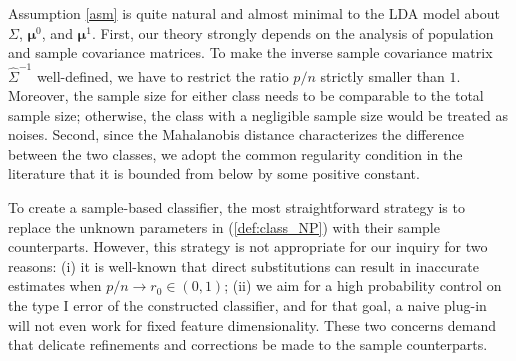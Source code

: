 \documentclass[12pt]{article}
\numberwithin{equation}{section}
\theoremstyle{remark}
\newcommand{\1}{{\rm 1}\kern-0.24em{\rm I}}
\begin{document}
 Assumption \ref{asm} is quite natural and almost minimal to the LDA model about $\Sigma$, ${\bm \mu}^0$, and ${\bm \mu}^1$.  First, our theory strongly depends on the analysis of population and  sample covariance matrices. To make the inverse  sample covariance matrix $\widehat{\Sigma}^{-1}$ well-defined, we have to restrict the ratio $p/n$ strictly smaller than $1$. Moreover, the sample size for either class needs to be comparable to the total sample size; otherwise, the class with a negligible sample size would be treated as noises. %
Second, since the Mahalanobis distance characterizes the difference between  the two classes, we adopt the common regularity condition in the literature that it is bounded from below by some positive constant. 


To create a sample-based classifier, the most straightforward strategy is to replace the unknown parameters in (\ref{def:class_NP}) with their sample counterparts. However, this strategy is not appropriate for our inquiry for two reasons:  (i) it is well-known that direct substitutions can result in inaccurate estimates when $p/n\to r_0\in (0,1)$; (ii) we aim for a high probability control on the type I error of the constructed classifier, and for that goal, a naive plug-in will not even work for fixed feature dimensionality.  These two concerns demand that delicate refinements and corrections be made to the sample counterparts. 
\end{document}
